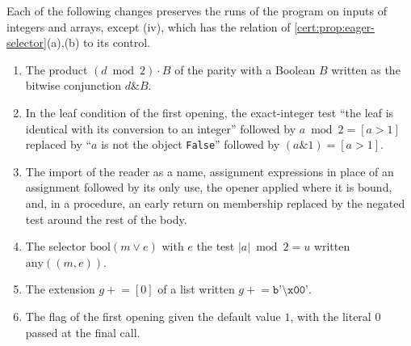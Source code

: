 \begin{proposition}\label{cert:prop:abstraction}
Each of the following changes preserves the runs of the program on inputs of
integers and arrays, except (iv), which has the relation of
\cref{cert:prop:eager-selector}(a),(b) to its control.
\begin{enumerate}[label=(\roman*)]
\item The product $(d\bmod 2)\cdot B$ of the parity with a Boolean $B$ written
as the bitwise conjunction $d\mathbin{\&}B$.
\item In the leaf condition of the first opening, the exact-integer test
``the leaf is identical with its conversion to an integer'' followed by
$a\bmod 2=[a>1]$ replaced by ``$a$ is not the object \texttt{False}'' followed
by $(a\mathbin{\&}1)=[a>1]$.
\item The import of the reader as a name, assignment expressions in place of
an assignment followed by its only use, the opener applied where it is bound,
and, in a procedure, an early return on membership replaced by the negated
test around the rest of the body.
\item The selector $\mathrm{bool}(m\lor e)$ with $e$ the test
$\lvert a\rvert\bmod 2=u$ written $\mathrm{any}((m,e))$.
\item The extension $g\mathrel{+}=[0]$ of a list written
$g\mathrel{+}=\texttt{b'\textbackslash x00'}$.
\item The flag of the first opening given the default value $1$, with the
literal $0$ passed at the final call.
\end{enumerate}
\end{proposition}

